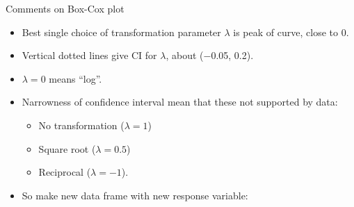 \documentclass[ignorenonframetext,]{beamer}
\newenvironment{Shaded}{\begin{snugshade}}{\end{snugshade}}
\newcommand{\DataTypeTok}[1]{\textcolor[rgb]{0.13,0.29,0.53}{#1}}
\newcommand{\DecValTok}[1]{\textcolor[rgb]{0.00,0.00,0.81}{#1}}
\newcommand{\KeywordTok}[1]{\textcolor[rgb]{0.13,0.29,0.53}{\textbf{#1}}}
\newcommand{\NormalTok}[1]{#1}
\newcommand{\OperatorTok}[1]{\textcolor[rgb]{0.81,0.36,0.00}{\textbf{#1}}}
\newcommand{\StringTok}[1]{\textcolor[rgb]{0.31,0.60,0.02}{#1}}
\providecommand{\tightlist}{%
  \setlength{\itemsep}{0pt}\setlength{\parskip}{0pt}}
\begin{document}
\begin{frame}[fragile]{Comments on Box-Cox plot}
\protect\hypertarget{comments-on-box-cox-plot}{}

\begin{itemize}
\tightlist
\item
  Best single choice of transformation parameter \(\lambda\) is peak of
  curve, close to 0.
\item
  Vertical dotted lines give CI for \(\lambda\), about (−0.05, 0.2).
\item
  \(\lambda = 0\) means ``log''.
\item
  Narrowness of confidence interval mean that these not supported by
  data:

  \begin{itemize}
  \tightlist
  \item
    No transformation (\(\lambda = 1\))
  \item
    Square root (\(\lambda = 0.5\))
  \item
    Reciprocal (\(\lambda = −1\)).
  \end{itemize}
\item
  So make new data frame with new response variable:
\end{itemize}

\begin{Shaded}
\end{Shaded}

\end{frame}
\end{document}
